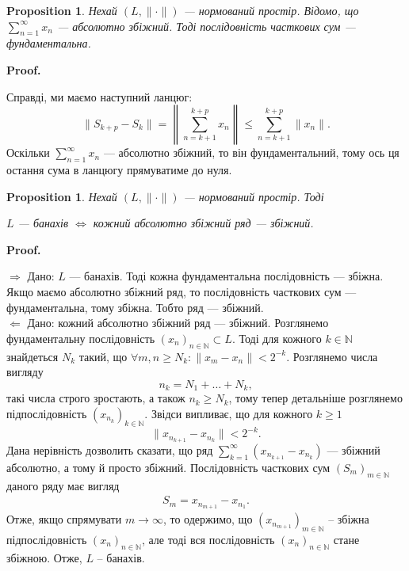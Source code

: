 \documentclass[a4paper, 10pt]{article}
\makeatletter
\def\rightproof{$\boxed{\Rightarrow}$ }
\def\leftproof{$\boxed{\Leftarrow}$ }
\theoremstyle{theoremdd}
\theoremstyle{theoremdd}
\theoremstyle{theoremdd}
\theoremstyle{theoremdd}
\theoremstyle{theoremdd}
\newtheorem{proposition}[theorem]{Proposition}
\theoremstyle{theoremdd}
\theoremstyle{theoremdd}
\theoremstyle{theoremdd}
\renewenvironment{proof}[1][Proof.\\]{\par
\pushQED{\hfill \qed}%
\normalfont \topsep6\p@\@plus6\p@\relax
\trivlist
\item\relax
{\bfseries
#1\@addpunct{.}}\hspace\labelsep\ignorespaces
}{%
\popQED\endtrivlist\@endpefalse
}
\makeatother
\begin{document}
\begin{proposition}
Нехай $(L, \| \cdot \|)$ --- нормований простір. Відомо, що $\displaystyle\sum_{n=1}^\infty x_n$ --- абсолютно збіжний. Тоді послідовність часткових сум --- фундаментальна.
\end{proposition}

\begin{proof}
Справді, ми маємо наступний ланцюг:
\[
\| S_{k+p} - S_k \| = \left\| \sum_{n=k+1}^{k+p} x_n \right\| \leq \sum_{n=k+1}^{k+p}  \| x_n\|.
\]
Оскільки $\displaystyle\sum_{n=1}^\infty x_n$ --- абсолютно збіжний, то він фундаментальний, тому ось ця остання сума в ланцюгу прямуватиме до нуля.
\end{proof}

\begin{proposition}
Нехай $(L, \| \cdot \|)$ --- нормований простір. Тоді
\begin{center}
$L$ --- банахів $\iff$ кожний абсолютно збіжний ряд --- збіжний.
\end{center}
\end{proposition}

\begin{proof}
\rightproof Дано: $L$ --- банахів. Тоді кожна фундаментальна послідовність --- збіжна. Якщо маємо абсолютно збіжний ряд, то послідовність часткових сум --- фундаментальна, тому збіжна. Тобто ряд --- збіжний.
\bigskip \\
\leftproof Дано: кожний абсолютно збіжний ряд --- збіжний. Розглянемо фундаментальну послідовність $(x_n)_{n \in \mathbb{N}} \subset L$. Тоді для кожного $k \in \mathbb{N}$ знайдеться $N_k$ такий, що $\forall m,n \geq N_k: \| x_m - x_n \| < 2^{-k}$. Розглянемо числа вигляду
\[
n_k = N_1 + \dots + N_k,
\]
такі числа строго зростають, а також $n_k \geq N_k$, тому тепер детальніше розглянемо підпослідовність $(x_{n_k})_{k \in \mathbb{N}}$. Звідси випливає, що для кожного $k \geq 1$
\[
\| x_{n_{k+1}} - x_{n_k} \| < 2^{-k}.
\]
Дана нерівність дозволить сказати, що ряд $\displaystyle\sum_{k=1}^\infty (x_{n_{k+1}} - x_{n_k})$ --- збіжний абсолютно, а тому й просто збіжний. Послідовність часткових сум $(S_m)_{m \in \mathbb{N}}$ даного ряду має вигляд
\begin{align*}
S_m = x_{n_{m+1}} - x_{n_1}.
\end{align*}
Отже, якщо спрямувати $m \to \infty$, то одержимо, що $(x_{n_{m+1}})_{m \in \mathbb{N}}$ -- збіжна підпослідовність $(x_n)_{n \in \mathbb{N}}$, але тоді вся послідовність $(x_n)_{n \in \mathbb{N}}$ стане збіжною. Отже, $L$ -- банахів. 
\end{proof}
\end{document}
